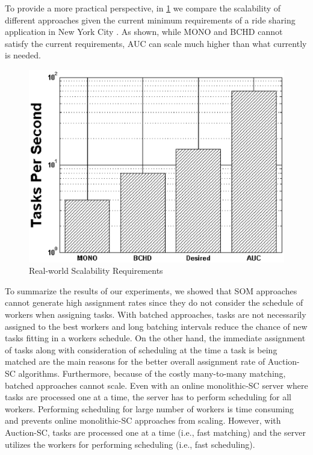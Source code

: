 To provide a more practical perspective, in \cref{fig:req} we compare the scalability of different approaches given the current minimum requirements of a ride sharing application in New York City \cite{NYCTaxi}. As shown, while MONO and BCHD cannot satisfy the current requirements, AUC can scale much higher than what currently is needed.

\begin{figure}[h]
	\centering
	\includegraphics[width = 0.3\columnwidth]{figures/scale_req.eps}
	\vspace{-0.1in}
	\caption{Real-world Scalability Requirements}\label{fig:req}
\end{figure}

To summarize the results of our experiments, we showed that SOM approaches cannot generate high assignment rates since they do not consider the schedule of workers when assigning tasks. With batched approaches, tasks are not necessarily assigned to the best workers and long batching intervals reduce the chance of new tasks fitting in a workers schedule. On the other hand, the immediate assignment of tasks along with consideration of scheduling at the time a task is being matched are the main reasons for the better overall assignment rate of Auction-SC algorithms. Furthermore, because of the costly many-to-many matching, batched approaches cannot scale. Even with an online monolithic-SC server where tasks are processed one at a time, the server has to perform scheduling for all workers. Performing scheduling for large number of workers is time consuming and prevents online monolithic-SC approaches from scaling. However, with Auction-SC, tasks are processed one at a time (i.e., fast matching) and the server utilizes the workers for performing scheduling (i.e., fast scheduling).

